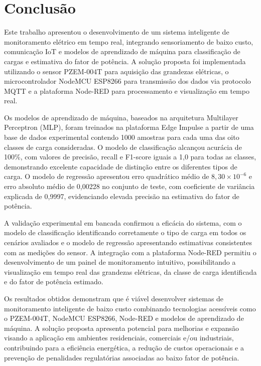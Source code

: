 \chapter{Conclusão} \label{Conclusão}

Este trabalho apresentou o desenvolvimento de um sistema inteligente de monitoramento elétrico em tempo real, integrando sensoriamento de baixo custo, comunicação IoT e modelos de aprendizado de máquina para classificação de cargas e estimativa do fator de potência. A solução proposta foi implementada utilizando o sensor PZEM-004T para aquisição das grandezas elétricas, o microcontrolador NodeMCU ESP8266 para transmissão dos dados via protocolo MQTT e a plataforma Node-RED para processamento e visualização em tempo real.

Os modelos de aprendizado de máquina, baseados na arquitetura Multilayer Perceptron (MLP), foram treinados na plataforma Edge Impulse a partir de uma base de dados experimental contendo 1000 amostras para cada uma das oito classes de carga consideradas. O modelo de classificação alcançou acurácia de 100\%, com valores de precisão, recall e F1-score iguais a 1,0 para todas as classes, demonstrando excelente capacidade de distinção entre os diferentes tipos de carga. O modelo de regressão apresentou erro quadrático médio de \(8,30 \times 10^{-6}\) e erro absoluto médio de 0,00228 no conjunto de teste, com coeficiente de variância explicada de 0,9997, evidenciando elevada precisão na estimativa do fator de potência.

A validação experimental em bancada confirmou a eficácia do sistema, com o modelo de classificação identificando corretamente o tipo de carga em todos os cenários avaliados e o modelo de regressão apresentando estimativas consistentes com as medições do sensor. A integração com a plataforma Node-RED permitiu o desenvolvimento de um painel de monitoramento intuitivo, possibilitando a visualização em tempo real das grandezas elétricas, da classe de carga identificada e do fator de potência estimado.

Os resultados obtidos demonstram que é viável desenvolver sistemas de monitoramento inteligente de baixo custo combinando tecnologias acessíveis como o PZEM-004T, NodeMCU ESP8266, Node-RED e modelos de aprendizado de máquina. A solução proposta apresenta potencial para melhorias e expansão visando a aplicação em ambientes residenciais, comerciais e/ou industriais, contribuindo para a eficiência energética, a redução de custos operacionais e a prevenção de penalidades regulatórias associadas ao baixo fator de potência.

